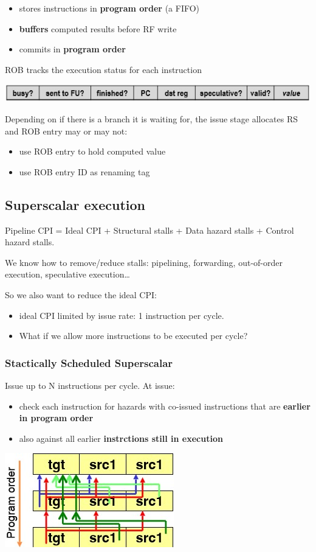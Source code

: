 \documentclass[letterpaper,12pt]{article}
\begin{document}
\begin{itemize}
    \item stores instructions in \textbf{program order} (a FIFO)
    \item \textbf{buffers} computed results before RF write
    \item commits in \textbf{program order}
\end{itemize}

ROB tracks the execution status for each instruction

\includegraphics*[scale=0.9]{Image/ROB execution stage.jpg}

Depending on if there is a branch it is waiting for, the issue stage allocates RS and ROB entry may or may not:
\begin{itemize}
    \item use ROB entry to hold computed value
    \item use ROB entry ID as renaming tag
\end{itemize}

\subsection{Superscalar execution}

Pipeline CPI = Ideal CPI + Structural stalls + Data hazard stalls + Control hazard stalls.

We know how to remove/reduce stalls: pipelining, forwarding, out-of-order execution, speculative execution\ldots

So we also want to reduce the ideal CPI:
\begin{itemize}
    \item ideal CPI limited by issue rate: 1 instruction per cycle.
    \item What if we allow more instructions to be executed per cycle?
\end{itemize}

\subsubsection{Stactically Scheduled Superscalar}
Issue up to N instructions per cycle. At issue:
\begin{itemize}
    \item check each instruction for hazards with co-issued instructions that are \textbf{earlier in program order}
    \item also against all earlier \textbf{instrctions still in execution}
\end{itemize}
\includegraphics*{Image/Stactically Scheduled Superscalar.jpg}
\end{document}
